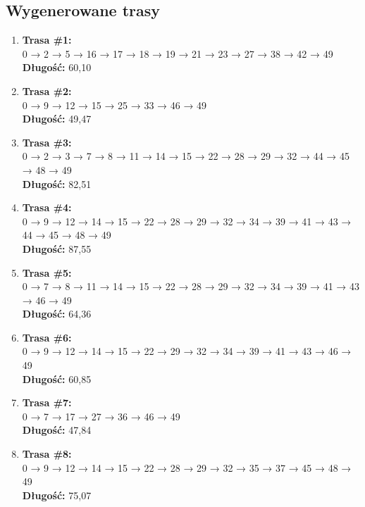 \documentclass{article}
\begin{document}
\subsection*{Wygenerowane trasy}

\begin{enumerate}
    \item \textbf{Trasa \#1:}\\
    0 → 2 → 5 → 16 → 17 → 18 → 19 → 21 → 23 → 27 → 38 → 42 → 49\\
    \textbf{Długość:} 60{,}10

    \item \textbf{Trasa \#2:}\\
    0 → 9 → 12 → 15 → 25 → 33 → 46 → 49\\
    \textbf{Długość:} 49{,}47

    \item \textbf{Trasa \#3:}\\
    0 → 2 → 3 → 7 → 8 → 11 → 14 → 15 → 22 → 28 → 29 → 32 → 44 → 45 → 48 → 49\\
    \textbf{Długość:} 82{,}51

    \item \textbf{Trasa \#4:}\\
    0 → 9 → 12 → 14 → 15 → 22 → 28 → 29 → 32 → 34 → 39 → 41 → 43 → 44 → 45 → 48 → 49\\
    \textbf{Długość:} 87{,}55

    \item \textbf{Trasa \#5:}\\
    0 → 7 → 8 → 11 → 14 → 15 → 22 → 28 → 29 → 32 → 34 → 39 → 41 → 43 → 46 → 49\\
    \textbf{Długość:} 64{,}36

    \item \textbf{Trasa \#6:}\\
    0 → 9 → 12 → 14 → 15 → 22 → 29 → 32 → 34 → 39 → 41 → 43 → 46 → 49\\
    \textbf{Długość:} 60{,}85

    \item \textbf{Trasa \#7:}\\
    0 → 7 → 17 → 27 → 36 → 46 → 49\\
    \textbf{Długość:} 47{,}84

    \item \textbf{Trasa \#8:}\\
    0 → 9 → 12 → 14 → 15 → 22 → 28 → 29 → 32 → 35 → 37 → 45 → 48 → 49\\
    \textbf{Długość:} 75{,}07


\end{enumerate}
\end{document}
